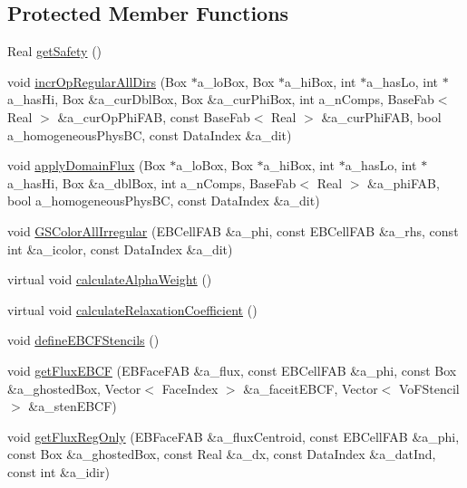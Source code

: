 \subsection*{Protected Member Functions}
\begin{DoxyCompactItemize}
\item 
Real \hyperlink{classnwoebconductivityop_a179713d173bac903dd38e4e1dda811b1}{get\+Safety} ()
\item 
void \hyperlink{classnwoebconductivityop_aa8b5aca0ece775d2a189a6a7e68892ac}{incr\+Op\+Regular\+All\+Dirs} (Box $\ast$a\+\_\+lo\+Box, Box $\ast$a\+\_\+hi\+Box, int $\ast$a\+\_\+has\+Lo, int $\ast$a\+\_\+has\+Hi, Box \&a\+\_\+cur\+Dbl\+Box, Box \&a\+\_\+cur\+Phi\+Box, int a\+\_\+n\+Comps, Base\+Fab$<$ Real $>$ \&a\+\_\+cur\+Op\+Phi\+F\+AB, const Base\+Fab$<$ Real $>$ \&a\+\_\+cur\+Phi\+F\+AB, bool a\+\_\+homogeneous\+Phys\+BC, const Data\+Index \&a\+\_\+dit)
\item 
void \hyperlink{classnwoebconductivityop_a0f80ee708f3ff463e38fc9a8472e0ba1}{apply\+Domain\+Flux} (Box $\ast$a\+\_\+lo\+Box, Box $\ast$a\+\_\+hi\+Box, int $\ast$a\+\_\+has\+Lo, int $\ast$a\+\_\+has\+Hi, Box \&a\+\_\+dbl\+Box, int a\+\_\+n\+Comps, Base\+Fab$<$ Real $>$ \&a\+\_\+phi\+F\+AB, bool a\+\_\+homogeneous\+Phys\+BC, const Data\+Index \&a\+\_\+dit)
\item 
void \hyperlink{classnwoebconductivityop_ad4e010866dcc89a038275069997232d9}{G\+S\+Color\+All\+Irregular} (E\+B\+Cell\+F\+AB \&a\+\_\+phi, const E\+B\+Cell\+F\+AB \&a\+\_\+rhs, const int \&a\+\_\+icolor, const Data\+Index \&a\+\_\+dit)
\item 
virtual void \hyperlink{classnwoebconductivityop_ac1eb06a10f846c6bfe6ab1e9818195eb}{calculate\+Alpha\+Weight} ()
\item 
virtual void \hyperlink{classnwoebconductivityop_ab7c9ce2c4378433f6466c8568501c2a3}{calculate\+Relaxation\+Coefficient} ()
\item 
void \hyperlink{classnwoebconductivityop_a56ae2b6f3790a36cd3bee957f9fc56ad}{define\+E\+B\+C\+F\+Stencils} ()
\item 
void \hyperlink{classnwoebconductivityop_a90d33085058b8f258b42731b3a2b7926}{get\+Flux\+E\+B\+CF} (E\+B\+Face\+F\+AB \&a\+\_\+flux, const E\+B\+Cell\+F\+AB \&a\+\_\+phi, const Box \&a\+\_\+ghosted\+Box, Vector$<$ Face\+Index $>$ \&a\+\_\+faceit\+E\+B\+CF, Vector$<$ Vo\+F\+Stencil $>$ \&a\+\_\+sten\+E\+B\+CF)
\item 
void \hyperlink{classnwoebconductivityop_ae4ee0ebb104d2e288e0f511a11d745ff}{get\+Flux\+Reg\+Only} (E\+B\+Face\+F\+AB \&a\+\_\+flux\+Centroid, const E\+B\+Cell\+F\+AB \&a\+\_\+phi, const Box \&a\+\_\+ghosted\+Box, const Real \&a\+\_\+dx, const Data\+Index \&a\+\_\+dat\+Ind, const int \&a\+\_\+idir)
\end{DoxyCompactItemize}

